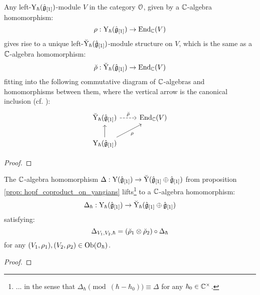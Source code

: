         \begin{lemma} \label{lemma: lifting_representations_of_formal_affine_yangians_to_root_grading_completions}
            Any left-$\mathrm{Y}_{\hbar}(\hat{\mathfrak{g}}_{[1]})$-module $V$ in the category $\mathcal{O}$, given by a $\mathbb{C}$-algebra homomorphism:
                $$\rho: \mathrm{Y}_{\hbar}(\hat{\mathfrak{g}}_{[1]}) \to \mathrm{End}_{\mathbb{C}}(V)$$
            gives rise to a unique left-$\breve{\mathrm{Y}}_{\hbar}(\hat{\mathfrak{g}}_{[1]})$-module structure on $V$, which is the same as a $\mathbb{C}$-algebra homomorphism:
                $$\breve{\rho}: \breve{\mathrm{Y}}_{\hbar}(\hat{\mathfrak{g}}_{[1]}) \to \mathrm{End}_{\mathbb{C}}(V)$$
            fitting into the following commutative diagram of $\mathbb{C}$-algebras and homomorphisms between them, where the vertical arrow is the canonical inclusion (cf. \cite[Section 5, Lemma 5.3]{guay_nakajima_wendlandt_affine_yangian_coproduct}):
                $$
                    \begin{tikzcd}
                	{\breve{\rmY}_{\hbar}(\hat{\g}_{[1]})} & {\End_{\bbC}(V)} \\
                	{\rmY_{\hbar}(\hat{\g}_{[1]})}
                	\arrow[from=2-1, to=1-1]
                	\arrow["{\breve{\rho}}", dashed, from=1-1, to=1-2]
                	\arrow["\rho"', from=2-1, to=1-2]
                    \end{tikzcd}
                $$
        \end{lemma}
            \begin{proof}
                
            \end{proof}
        \begin{theorem} \label{theorem: hopf_coproduct_on_formal_yangians}
            The $\mathbb{C}$-algebra homomorphism $\Delta: \mathrm{Y}(\hat{\mathfrak{g}}_{[1]}) \to \breve{\mathrm{Y}}(\hat{\mathfrak{g}}_{[1]} \oplus \hat{\mathfrak{g}}_{[1]})$ from proposition \ref{prop: hopf_coproduct_on_yangians} lifts\footnote{... in the sense that $\Delta_{\hbar} \pmod{(\hbar - \hbar_0)} \equiv \Delta$ for any $\hbar_0 \in \bbC^{\x}$.} to a $\mathbb{C}$-algebra homomorphism:
                $$\Delta_{\hbar}: \mathrm{Y}_{\hbar}(\hat{\mathfrak{g}}_{[1]}) \to \breve{\mathrm{Y}}_{\hbar}(\hat{\mathfrak{g}}_{[1]} \oplus \hat{\mathfrak{g}}_{[1]})$$
            satisfying:
                $$\Delta_{V_1, V_2, \hbar} = (\breve{\rho}_1 \tensor \breve{\rho}_2) \circ \Delta_{\hbar}$$
            for any $(V_1, \rho_1), (V_2, \rho_2) \in \mathrm{Ob}(\mathcal{O}_{\hbar})$.
        \end{theorem}
            \begin{proof}
                
            \end{proof}
        
